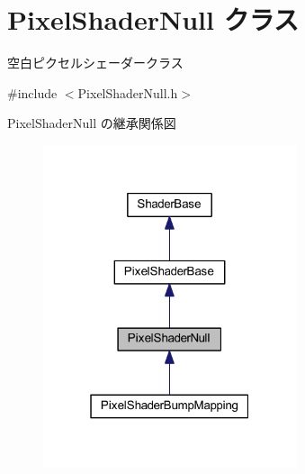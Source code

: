 \hypertarget{class_pixel_shader_null}{}\section{Pixel\+Shader\+Null クラス}
\label{class_pixel_shader_null}


空白ピクセルシェーダークラス  




{\ttfamily \#include $<$Pixel\+Shader\+Null.\+h$>$}



Pixel\+Shader\+Null の継承関係図\nopagebreak
\begin{figure}[H]
\begin{center}
\leavevmode
\includegraphics[width=211pt]{class_pixel_shader_null__inherit__graph}
\end{center}
\end{figure}
